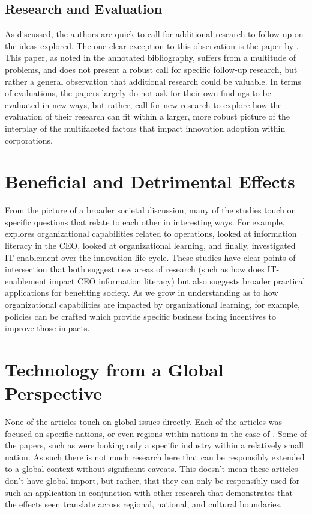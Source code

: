 \subsection{Research and Evaluation}

As discussed, the authors are quick to call for additional research to follow up on the ideas explored. The one clear exception to this observation is the paper by \textcite{isadaEmpiricalStudyRegarding2017}. This paper, as noted in the annotated bibliography, suffers from a multitude of problems, and does not present a robust call for specific follow-up research, but rather a general observation that additional research could be valuable. In terms of evaluations, the papers largely do not ask for their own findings to be evaluated in new ways, but rather, call for new research to explore how the evaluation of their research can fit within a larger, more robust picture of the interplay of the multifaceted factors that impact innovation adoption within corporations.

\section{Beneficial and Detrimental Effects}

From the picture of a broader societal discussion, many of the studies touch on specific questions that relate to each other in interesting ways. For example, \textcite{aliEmpiricalStudyExplore2019} explores organizational capabilities related to operations, \textcite{ahmadImpactWorkplaceInformation2020} looked at information literacy in the CEO, \textcite{tortorellaOrganizationalLearningPaths2020} looked at organizational learning, and finally, \textcite{nevoExploringRoleIT2020} investigated IT-enablement over the innovation life-cycle. These studies have clear points of intersection that both suggest new areas of research (such as how does IT-enablement impact CEO information literacy) but also suggests broader practical applications for benefiting society. As we grow in understanding as to how organizational capabilities are impacted by organizational learning, for example, policies can be crafted which provide specific business facing incentives to improve those impacts.

\section{Technology from a Global Perspective}

None of the articles touch on global issues directly. Each of the articles was focused on specific nations, or even regions within nations in the case of \textcite{matsuzakiInnovationUpgradingLocal2020}. Some of the papers, such as \textcite{chukwuemekak.echebiriEmpiricalStudyIndividualLevel2020} were looking only a specific industry within a relatively small nation. As such there is not much research here that can be responsibly extended to a global context without significant caveats. This doesn't mean these articles don't have global import, but rather, that they can only be responsibly used for such an application in conjunction with other research that demonstrates that the effects seen translate across regional, national, and cultural boundaries.
